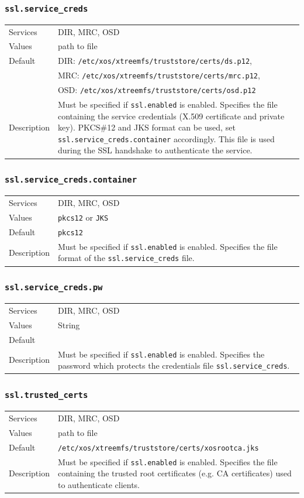 \documentclass[a4paper,10pt]{book}
\begin{document}
\subsubsection{\texttt{ssl.service\_creds}}
\begin{tabular}{lp{10cm}}
 Services & DIR, MRC, OSD\\
 Values   & path to file\\
 Default  & DIR: \texttt{/etc/xos/xtreemfs/truststore/certs/ds.p12}, \\
 & MRC: \texttt{/etc/xos/xtreemfs/truststore/certs/mrc.p12}, \\
 & OSD: \texttt{/etc/xos/xtreemfs/truststore/certs/osd.p12}\\
 Description & Must be specified if \texttt{ssl.enabled} is enabled. Specifies the file containing the service credentials (X.509 certificate and private key). PKCS\#12 and JKS format can be used, set \texttt{ssl.service\_creds.container} accordingly. This file is used during the SSL handshake to authenticate the service.
\end{tabular}

\subsubsection{\texttt{ssl.service\_creds.container}}
\begin{tabular}{lp{10cm}}
 Services & DIR, MRC, OSD\\
 Values   & \texttt{pkcs12} or \texttt{JKS}\\
 Default  & \texttt{pkcs12}\\
 Description & Must be specified if \texttt{ssl.enabled} is enabled. Specifies the file format of the \texttt{ssl.service\_creds} file.
\end{tabular}

\subsubsection{\texttt{ssl.service\_creds.pw}}
\begin{tabular}{lp{10cm}}
 Services & DIR, MRC, OSD\\
 Values   & String\\
 Default  & \\
 Description & Must be specified if \texttt{ssl.enabled} is enabled. Specifies the password which protects the credentials file \texttt{ssl.service\_creds}.
\end{tabular}

\subsubsection{\texttt{ssl.trusted\_certs}}
\begin{tabular}{lp{10cm}}
 Services & DIR, MRC, OSD\\
 Values   & path to file\\
 Default  & \texttt{/etc/xos/xtreemfs/truststore/certs/xosrootca.jks}\\
 Description & Must be specified if \texttt{ssl.enabled} is enabled. Specifies the file containing the trusted root certificates (e.g. CA certificates) used to authenticate clients.
\end{tabular}
\end{document}

